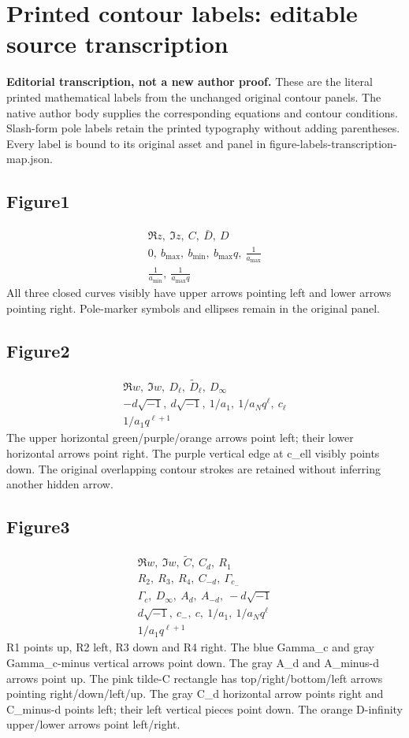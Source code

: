 \section*{Printed contour labels: editable source transcription}
\noindent\textbf{Editorial transcription, not a new author proof.} These are the literal printed mathematical labels from the unchanged original contour panels. The native author body supplies the corresponding equations and contour conditions. Slash-form pole labels retain the printed typography without adding parentheses. Every label is bound to its original asset and panel in figure-labels-transcription-map.json.
\subsection*{Figure1}
\[\begin{gathered}\Re z,\ \Im z,\ C,\ \bar D,\ D\\
0,\ b_{\max},\ b_{\min},\ b_{\max}q,\ \frac1{a_{\max}}\\
\frac1{a_{\min}},\ \frac1{a_{\max}q}\end{gathered}\]
\noindent All three closed curves visibly have upper arrows pointing left and lower arrows pointing right. Pole-marker symbols and ellipses remain in the original panel.\par
\subsection*{Figure2}
\[\begin{gathered}\Re w,\ \Im w,\ D_\ell,\ \tilde D_\ell,\ D_\infty\\
-d\sqrt{-1},\ d\sqrt{-1},\ 1/a_1,\ 1/a_Nq^\ell,\ c_\ell\\
1/a_1q^{\ell+1}\end{gathered}\]
\noindent The upper horizontal green/purple/orange arrows point left; their lower horizontal arrows point right. The purple vertical edge at c\_ell visibly points down. The original overlapping contour strokes are retained without inferring another hidden arrow.\par
\subsection*{Figure3}
\[\begin{gathered}\Re w,\ \Im w,\ \tilde C,\ C_d,\ R_1\\
R_2,\ R_3,\ R_4,\ C_{-d},\ \Gamma_{c_-}\\
\Gamma_c,\ D_\infty,\ A_d,\ A_{-d},\ -d\sqrt{-1}\\
d\sqrt{-1},\ c_-,\ c,\ 1/a_1,\ 1/a_Nq^\ell\\
1/a_1q^{\ell+1}\end{gathered}\]
\noindent R1 points up, R2 left, R3 down and R4 right. The blue Gamma\_c and gray Gamma\_c-minus vertical arrows point down. The gray A\_d and A\_minus-d arrows point up. The pink tilde-C rectangle has top/right/bottom/left arrows pointing right/down/left/up. The gray C\_d horizontal arrow points right and C\_minus-d points left; their left vertical pieces point down. The orange D-infinity upper/lower arrows point left/right.\par
